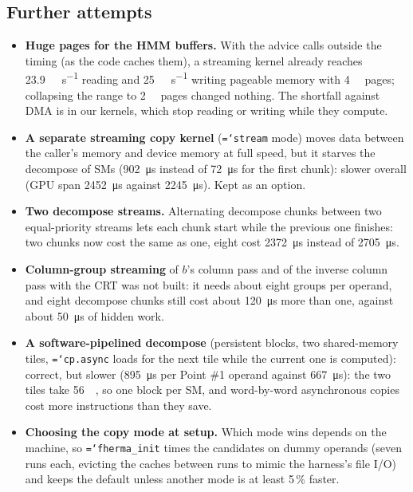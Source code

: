 \documentclass[11pt,a4paper]{article}
\newcommand{\code}[1]{\texttt{\hyphenchar\font=`\-\relax #1}}
\newcommand{\us}[1]{\SI{#1}{\micro\second}}
\begin{document}
\subsection{Further attempts}
\begin{itemize}[leftmargin=*]
\item \textbf{Huge pages for the HMM buffers.} With the advice calls outside the timing (as
  the code caches them), a streaming kernel already reaches \SI{23.9}{\giga\byte\per\second}
  reading and \SI{25}{\giga\byte\per\second} writing pageable memory with \SI{4}{\kilo\byte}
  pages; collapsing the range to \SI{2}{\mega\byte} pages changed nothing. The shortfall
  against DMA is in our kernels, which stop reading or writing while they compute.
\item \textbf{A separate streaming copy kernel} (\code{stream} mode) moves data between the
  caller's memory and device memory at full speed, but it starves the decompose of SMs
  (\us{902} instead of \us{72} for the first chunk): slower overall (GPU span \us{2452}
  against \us{2245}). Kept as an option.
\item \textbf{Two decompose streams.} Alternating decompose chunks between two equal-priority
  streams lets each chunk start while the previous one finishes: two chunks now cost the same
  as one, eight cost \us{2372} instead of \us{2705}.
\item \textbf{Column-group streaming} of $b$'s column pass and of the inverse column pass
  with the CRT was not built: it needs about eight groups per operand, and eight decompose
  chunks still cost about \us{120} more than one, against about \us{50} of hidden work.
\item \textbf{A software-pipelined decompose} (persistent blocks, two shared-memory tiles,
  \code{cp.async} loads for the next tile while the current one is computed): correct, but
  slower (\us{895} per Point \#1 operand against \us{667}): the two tiles take
  \SI{56}{\kilo\byte}, so one block per SM, and word-by-word asynchronous copies cost more
  instructions than they save.
\item \textbf{Choosing the copy mode at setup.} Which mode wins depends on the machine, so
  \code{fherma\_init} times the candidates on dummy operands (seven runs each, evicting the
  caches between runs to mimic the harness's file I/O) and keeps the default unless another
  mode is at least 5\,\% faster.
\end{itemize}

\end{document}
